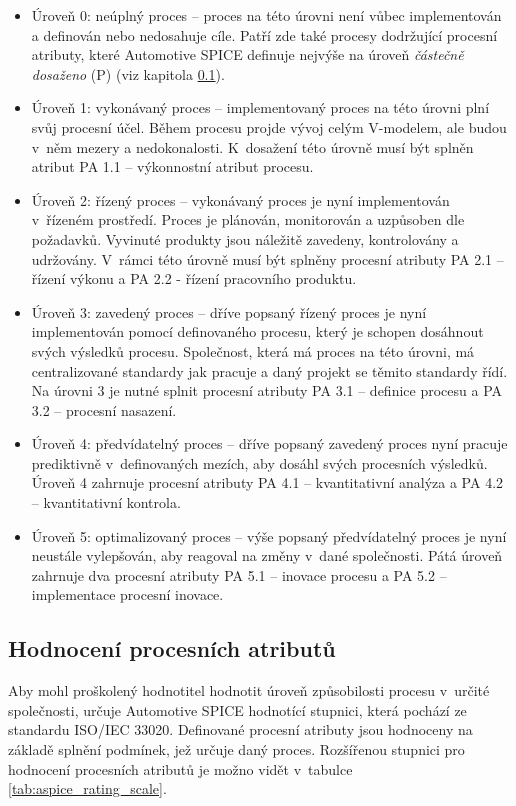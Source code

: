 \documentclass[czech,master]{diploma}
\begin{document}
\begin{itemize}
\item Úroveň 0: neúplný proces -- proces na této úrovni není vůbec implementován a definován nebo nedosahuje cíle. Patří zde také procesy dodržující procesní atributy, které Automotive SPICE definuje nejvýše na úroveň \textit{částečně dosaženo} (P) (viz kapitola \ref{sec:process_atributes}).

\item Úroveň 1: vykonávaný proces -- implementovaný proces na této úrovni plní svůj procesní účel. Během procesu projde vývoj celým V-modelem, ale budou v~něm mezery a nedokonalosti. K~dosažení této úrovně musí být splněn atribut PA 1.1 -- výkonnostní atribut procesu.

\item Úroveň 2: řízený proces -- vykonávaný proces je nyní implementován v~řízeném prostředí. Proces je plánován, monitorován a uzpůsoben dle požadavků. Vyvinuté produkty jsou náležitě zavedeny, kontrolovány a udržovány. V~rámci této úrovně musí být splněny procesní atributy PA 2.1 -- řízení výkonu a PA 2.2 - řízení pracovního produktu.

\item Úroveň 3: zavedený proces -- dříve popsaný řízený proces je nyní implementován pomocí definovaného procesu, který je schopen dosáhnout svých výsledků procesu. Společnost, která má proces na této úrovni, má centralizované standardy jak pracuje a daný projekt se těmito standardy řídí. Na úrovni 3 je nutné splnit procesní atributy PA 3.1 -- definice procesu a PA 3.2 -- procesní nasazení.

\item Úroveň 4: předvídatelný proces -- dříve popsaný zavedený proces nyní pracuje prediktivně v~definovaných mezích, aby dosáhl svých procesních výsledků. Úroveň 4 zahrnuje procesní atributy PA 4.1 -- kvantitativní analýza a PA 4.2 -- kvantitativní kontrola.

\item Úroveň 5: optimalizovaný proces -- výše popsaný předvídatelný proces je nyní neustále vylepšován, aby reagoval na změny v~dané společnosti. Pátá úroveň zahrnuje dva procesní atributy PA 5.1 -- inovace procesu a PA 5.2 -- implementace procesní inovace.

\end{itemize}

\subsection{Hodnocení procesních atributů}
\label{sec:process_atributes}
Aby mohl proškolený hodnotitel hodnotit úroveň způsobilosti procesu v~určité společnosti, určuje Automotive SPICE hodnotící stupnici, která pochází ze standardu ISO/IEC 33020. Definované procesní atributy jsou hodnoceny na základě splnění podmínek, jež určuje daný proces. Rozšířenou stupnici pro hodnocení procesních atributů je možno vidět v~tabulce \ref{tab:aspice_rating_scale}.
\end{document}
